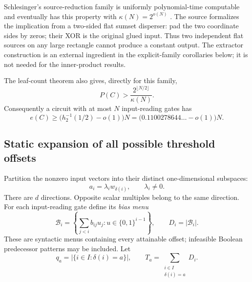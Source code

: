 \documentclass[11pt]{article}
\theoremstyle{definition}
\newcommand{\bits}{\{0,1\}}
\begin{document}
Schlesinger's source-reduction family is uniformly polynomial-time computable and eventually has this property with \(\kappa(N)=2^{o(N)}\) \cite{SchlesingerFamily26}. The source formalizes the implication from a two-sided flat sumset disperser: pad the two coordinate sides by zeros; their XOR is the original glued input. Thus two independent flat sources on any large rectangle cannot produce a constant output. The extractor construction is an external ingredient in the explicit-family corollaries below; it is not needed for the inner-product results.

The leaf-count theorem also gives, directly for this family,
\[
 P(C)>\frac{2^{\lfloor N/2\rfloor}}{\kappa(N)}.
\]
Consequently a circuit with at most \(N\) input-reading gates has
\[
 e(C)\ge\bigl(h_2^{-1}(1/2)-o(1)\bigr)N
       =\bigl(0.1100278644\ldots-o(1)\bigr)N.             \tag{13}
\]

\subsection{Static expansion of all possible threshold offsets}
Partition the nonzero input vectors into their distinct one-dimensional subspaces:
\[
 a_i=\lambda_i w_{\delta(i)},\qquad \lambda_i\ne0.
\]
There are \(d\) directions. Opposite scalar multiples belong to the same direction.
For each input-reading gate define its \emph{bias menu}
\[
 \mathcal B_i=\left\{\sum_{j<i}b_{ij}u_j:u\in\bits^{i-1}\right\},
 \qquad D_i=|\mathcal B_i|.
\]
These are syntactic menus containing every attainable offset; infeasible Boolean predecessor patterns may be included. Let
\[
 q_a=|\{i\in I:\delta(i)=a\}|,\qquad
 T_a=\sum_{\substack{i\in I\\\delta(i)=a}}D_i.             \tag{14}
\]
\end{document}
